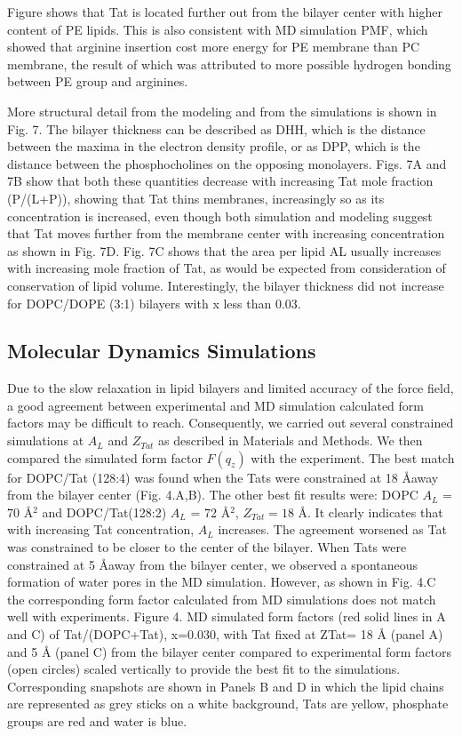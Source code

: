 Figure shows that Tat is located further out from the bilayer center with 
higher content of PE lipids. This is also consistent with MD simulation PMF,
which showed that arginine insertion cost more energy for PE membrane than
PC membrane, the result of which was attributed to more possible hydrogen 
bonding between PE group and arginines.

More structural detail from the modeling and from the simulations is shown in 
Fig. 7. The bilayer thickness can be described as DHH, which is the 
distance between the maxima in the electron density profile, or as DPP, which 
is the distance between the phosphocholines on the opposing monolayers. Figs. 
7A and 7B show that both these quantities decrease with increasing Tat mole 
fraction (P/(L+P)), showing that Tat thins membranes, increasingly so as its 
concentration is increased, even though both simulation and modeling suggest 
that Tat moves further from the membrane center with increasing concentration 
as shown in Fig. 7D.  Fig. 7C shows that the area per lipid AL usually increases 
with increasing mole fraction of Tat, as would be expected from consideration of 
conservation of lipid volume. Interestingly, the bilayer thickness did not 
increase for DOPC/DOPE (3:1) bilayers with x less than 0.03.  

\subsection{Molecular Dynamics Simulations}
Due to the slow relaxation in lipid bilayers and limited accuracy of the force 
field, a good
agreement between experimental and MD simulation calculated form factors may 
be difficult to
reach. Consequently, we carried out several constrained simulations at $A_L$ 
and $Z_{Tat}$ as described
in Materials and Methods. We then compared the simulated form factor $F(q_z)$ 
with the
experiment. The best match for DOPC/Tat (128:4) was found when the Tats were 
constrained at 18 \AA away from the bilayer center (Fig. 4.A,B). The other 
best fit results were: DOPC $A_L$ = 70 \AA$^2$ and DOPC/Tat(128:2) $A_L$ = 72 
\AA$^2$, $Z_{Tat} = 18$ \AA. It clearly indicates that with increasing Tat
concentration, $A_L$ increases. The agreement worsened as Tat was constrained 
to be closer to the
center of the bilayer. When Tats were constrained at 5 \AA away from the bilayer 
center, we
observed a spontaneous formation of water pores in the MD simulation. However, 
as shown in
Fig. 4.C the corresponding form factor calculated from MD simulations does not 
match well
with experiments.
Figure 4. MD simulated form factors (red solid lines in A and C) of Tat/(DOPC+Tat), x=0.030,
with Tat fixed at ZTat= 18 Å (panel A) and 5 Å (panel C) from the bilayer center compared to
experimental form factors (open circles) scaled vertically to provide the best fit to the
simulations. Corresponding snapshots are shown in Panels B and D in which the lipid chains are
represented as grey sticks on a white background, Tats are yellow, phosphate groups are red and
water is blue.




